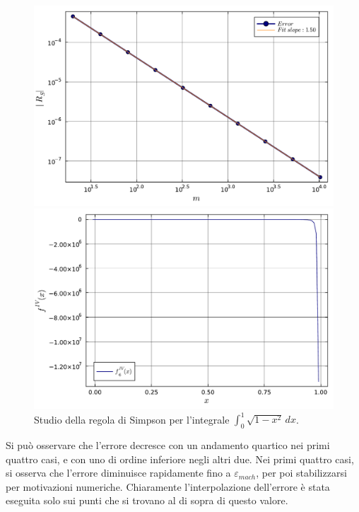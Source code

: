 \documentclass[letterpaper, 12pt]{article}
\numberwithin{equation}{section}    %
\begin{document}
\begin{figure}[!ht]
    \centering
    \begin{minipage}[b]{0.47\textwidth}
        \includegraphics[width=\textwidth]{5146.pdf}
    \end{minipage}
    \hspace{0.5cm}
    \begin{minipage}[b]{0.47\textwidth}
        \includegraphics[width=\textwidth]{5146_2.pdf}
    \end{minipage}
    \caption{Studio della regola di Simpson per l'integrale $\int_0^1 \sqrt{1-x^2}\, dx$.}
    \label{fig:es5_1_4_6}
\end{figure}

Si può osservare che l'errore decresce con un andamento quartico nei primi quattro casi, e con uno di ordine 
inferiore negli altri due. Nei primi quattro casi, si osserva che l'errore diminuisce rapidamente
fino a $\varepsilon_{mach}$, per poi stabilizzarsi per motivazioni numeriche. Chiaramente l'interpolazione
dell'errore è stata eseguita solo sui punti che si trovano al di sopra di questo valore.
\end{document}

